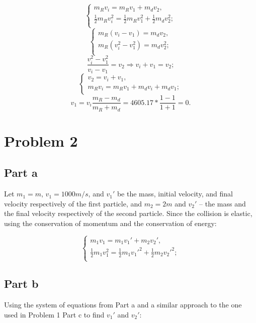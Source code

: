 \documentclass{article}
\begin{document}
\[
\begin{cases}
m_Rv_i = m_Rv_1 + m_dv_2,\\
\frac{1}{2}m_Rv_i^2 = \frac{1}{2}m_Rv_1^2 + \frac{1}{2}m_dv_2^2;\\
\end{cases}
\]
\[
\begin{cases}
m_R(v_i - v_1) = m_dv_2,\\
m_R(v_i^2 - v_1^2) = m_dv_2^2;\\
\end{cases}
\]
\[
\frac{v_i^2 - v_1^2}{v_i - v_1} = v_2 \Rightarrow v_i + v_1 = v_2;
\]
\[
\begin{cases}
v_2 = v_i + v_1,\\
m_Rv_i = m_Rv_1 + m_dv_i + m_dv_1;\\
\end{cases}
\]
\[
v_1 = v_i\frac{m_R - m_d}{m_R + m_d} = 4605.17 * \frac{1 - 1}{1 + 1} = 0.
\]

\section*{Problem 2}
\subsection*{Part a}
Let $m_1 = m$, $v_1 = 1000m/s$, and $v_1\prime$ be the mass, initial velocity, and final velocity respectively of the first particle, and $m_2 = 2m$ and $v_2\prime$ -- the mass and the final velocity respectively of the second particle. Since the collision is elastic, using the conservation of momentum and the conservation of energy:

\[
\begin{cases}
m_1v_1 = m_1v_1\prime + m_2v_2\prime,\\
\frac{1}{2}m_1v_1^2 = \frac{1}{2}m_1v_1\prime^2 + \frac{1}{2}m_2v_2\prime^2;\\
\end{cases}
\]

\subsection*{Part b}
Using the system of equations from Part a and a similar approach to the one used in Problem 1 Part c to find $v_1\prime$ and $v_2\prime$:
\end{document}
